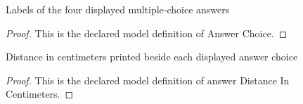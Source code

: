 \begin{definition}
  \label{def:physics:phyx-mini-0055:phyxminiproblems-problemphyxmini0055-answerchoice}
  Labels of the four displayed multiple-choice answers
\end{definition}
\begin{proof}
  This is the declared model definition of Answer Choice.
\end{proof}
\begin{definition}
  \label{def:physics:phyx-mini-0055:phyxminiproblems-problemphyxmini0055-answerdistanceincentimeters}
  Distance in centimeters printed beside each displayed answer choice
\end{definition}
\begin{proof}
  This is the declared model definition of answer Distance In Centimeters.
\end{proof}
